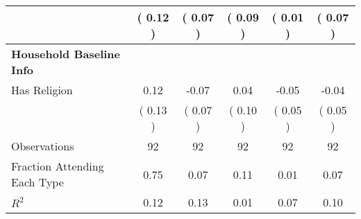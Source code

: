 \begin{table}[H]
{\begin{tabular}{lccccc}
\quad  & (     0.12 ) & (     0.07 )  & (     0.09 )  & (     0.01 ) & (     0.07 ) \\
\midrule
\textbf{Household Baseline Info} \\
\quad Has Religion &      0.12 &     -0.07 &      0.04 &     -0.05 &     -0.04 \\
\quad  & (     0.13 ) & (     0.07 )  & (     0.10 )  & (     0.05 ) & (     0.05 ) \\
\midrule
Observations & 92 & 92 & 92 & 92 & 92 \\
Fraction Attending Each Type &      0.75 &      0.07 &      0.11 &      0.01 &      0.07 \\
\midrule
$ R^2$ &      0.12 &      0.13 &      0.01 &      0.07 &      0.10 \\
\bottomrule
\end{tabular}}
\end{table}
